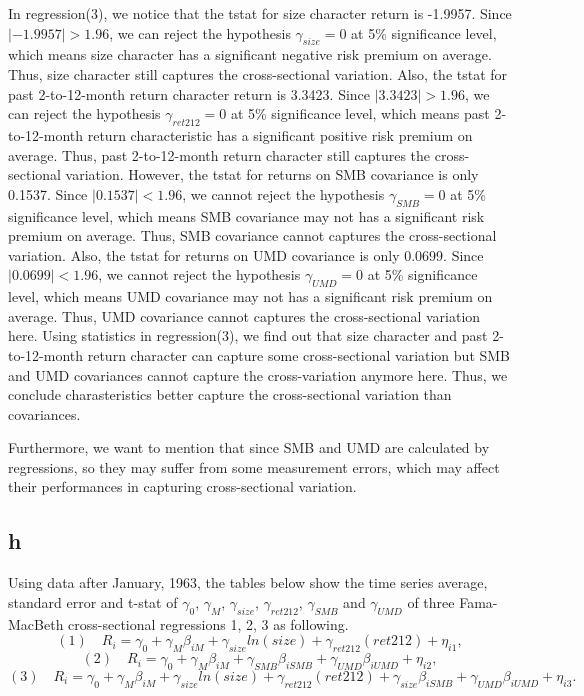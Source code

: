 \documentclass{report}
\begin{document}
In regression(3), we notice that the tstat for size character return is -1.9957. Since $|-1.9957|>1.96$, we can reject the hypothesis $\gamma_{size} = 0$ at 5\% significance level, which means size character has a significant negative risk premium on average. Thus, size character still captures the cross-sectional variation. Also, the tstat for past 2-to-12-month return  character return is 3.3423. Since $|3.3423|>1.96$, we can reject the hypothesis $\gamma_{ret212} = 0$ at 5\% significance level, which means past 2-to-12-month return characteristic has a significant positive risk premium on average. Thus, past 2-to-12-month return character still captures the cross-sectional variation. However, the tstat for returns on SMB covariance is only 0.1537. Since $|0.1537|<1.96$, we cannot reject the hypothesis $\gamma_{SMB} = 0$ at 5\% significance level, which means SMB covariance may not has a significant risk premium on average. Thus, SMB covariance cannot captures the cross-sectional variation. Also, the tstat for returns on UMD covariance is only 0.0699. Since $|0.0699|<1.96$, we cannot reject the hypothesis $\gamma_{UMD} = 0$ at 5\% significance level, which means UMD covariance may not has a significant risk premium on average. Thus, UMD covariance cannot captures the cross-sectional variation here. Using statistics in regression(3), we find out that size character and past 2-to-12-month return character can capture some cross-sectional variation but SMB and UMD covariances cannot capture the cross-variation anymore here. Thus, we conclude charasteristics better capture the cross-sectional variation than covariances. 

Furthermore, we want to mention that since SMB and UMD are calculated by regressions, so they may suffer from some measurement errors, which may affect their performances in capturing cross-sectional variation. 


\subsection{h}
Using data after January, 1963, the tables below show the time series average, standard error and t-stat of $\gamma_{0}$, $\gamma_{M}$, $\gamma_{size}$, $\gamma_{ret212}$, $\gamma_{SMB}$ and $\gamma_{UMD}$ of three Fama-MacBeth cross-sectional regressions 1, 2, 3 as following.
\[ (1) \quad R_{i} = \gamma_{0}+\gamma_{M}\beta_{iM}+\gamma_{size}ln(size)+\gamma_{ret212}(ret212)+\eta_{i1}, \]
\[ (2) \quad R_{i} = \gamma_{0}+\gamma_{M}\beta_{iM}+\gamma_{SMB}\beta_{iSMB}+\gamma_{UMD}\beta_{iUMD}+\eta_{i2}, \]
\[ (3) \quad R_{i} = \gamma_{0}+\gamma_{M}\beta_{iM}+\gamma_{size}ln(size)+\gamma_{ret212}(ret212)+\gamma_{size}\beta_{iSMB}+\gamma_{UMD}\beta_{iUMD}+\eta_{i3}. \]
\end{document}
